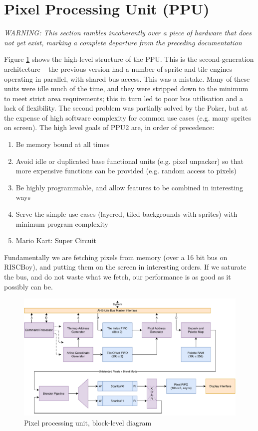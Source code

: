\section{Pixel Processing Unit (PPU)}

{\it WARNING: This section rambles incoherently over a piece of hardware that does not yet exist, marking a complete departure from the preceding documentation}

Figure \ref{diagram:ppu_block} shows the high-level structure of the PPU. This is the second-generation architecture -- the previous version had a number of sprite and tile engines operating in parallel, with shared bus access. This was a mistake. Many of these units were idle much of the time, and they were stripped down to the minimum to meet strict area requirements; this in turn led to poor bus utilisation and a lack of flexibility. The second problem was partially solved by the Poker, but at the expense of high software complexity for common use cases (e.g. many sprites on screen). The high level goals of PPU2 are, in order of precedence:

\begin{enumerate}
\item Be memory bound at all times
\item Avoid idle or duplicated base functional units (e.g. pixel unpacker) so that more expensive functions can be provided (e.g. random access to pixels)
\item Be highly programmable, and allow features to be combined in interesting ways
\item Serve the simple use cases (layered, tiled backgrounds with sprites) with minimum program complexity
\item Mario Kart: Super Circuit
\end{enumerate}

Fundamentally we are fetching pixels from memory (over a 16 bit bus on RISCBoy), and putting them on the screen in interesting orders. If we saturate the bus, and do not waste what we fetch, our performance is as good as it possibly can be.

\begin{figure}[H]
\centering
\caption{Pixel processing unit, block-level diagram}
\label{diagram:ppu_block}
\includegraphics[width=\textwidth]{diagrams/ppu_block.pdf}
\end{figure}

